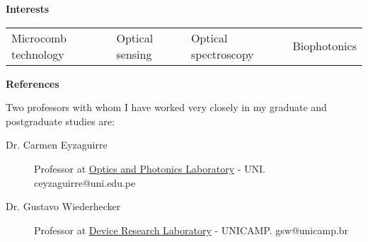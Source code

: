 \documentclass[letterpaper, 12pt]{article}[leftmargin=*]
\renewcommand{\section}[2]{
  \colorbox{secondary}{\color{white}\raggedbottom\normalsize\textbf{{#1}{\hspace{7pt}#2}}}
}
\newcommand{\resumeEntryStart}{\begin{itemize}[leftmargin=2.5mm]\itemsep8pt}
\newcommand{\resumeEntryEnd}{\end{itemize}}
\newcommand{\resumeEntryS}[2]{
  \item[]\small{
    \textbf{\color{primary}#1 }{ #2 }
  }
}
\newcommand{\fourthcol}[4]{
	\vspace{-0.3cm}
	\begin{tabularx}{\textwidth}{XXXX}
		{\small#1} & {\small#2} & {\small#3} & {\small#4}
	\end{tabularx}
}
\begin{document}
\section{\faThumbTack}{Interests}
\resumeEntryStart
\small
\fourthcol{\resumeEntryS{}{Microcomb technology}}{\resumeEntryS{}{Optical sensing}}{\resumeEntryS{}{Optical spectroscopy}}{\resumeEntryS{}{Biophotonics}}
\resumeEntryEnd

\section{\faTripadvisor}{References}

\vspace{5pt}
Two professors with whom I have worked very closely in my graduate and postgraduate studies are:
\begin{description}
	\item[Dr. Carmen Eyzaguirre] Professor at \href{https://fc.uni.edu.pe/fc/index.php/noticias-secundarias/item/12-eyzaguirre-gorvenia-carmen}{Optics and Photonics Laboratory} - UNI. \href{ceyzaguirre@uni.edu.pe}{\faEnvelopeO} ceyzaguirre@uni.edu.pe
	\item[Dr. Gustavo Wiederhecker] Professor at \href{https://sites.ifi.unicamp.br/lpd/}{Device Research Laboratory} - UNICAMP. \href{gsw@unicamp.br}{\faEnvelopeO} gsw@unicamp.br
\end{description}
\end{document}
